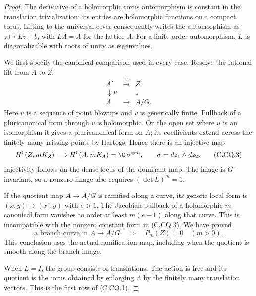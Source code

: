 \begin{proof}
The derivative of a holomorphic torus automorphism is
constant in the translation trivialization: its entries
are holomorphic functions on a compact torus. Lifting to
the universal cover consequently writes the automorphism
as $z\mapsto Lz+b$, with $L\Lambda=\Lambda$ for the
lattice $\Lambda$. For a finite-order automorphism, $L$
is diagonalizable with roots of unity as eigenvalues.

We first specify the canonical comparison used in every
case. Resolve the rational lift from $A$ to $Z$:
\[
\begin{array}{ccc}
A'&\xrightarrow{\ v\ }&Z\\
\downarrow{\scriptstyle u}&&\downarrow\\
A&\longrightarrow&A/G .
\end{array}                                                    \tag{C.CQ.2}
\]
Here $u$ is a sequence of point blowups and $v$ is
generically finite. Pullback of a pluricanonical form
through $v$ is holomorphic. On the open set where $u$
is an isomorphism it gives a pluricanonical form on
$A$; its coefficients extend across the finitely many
missing points by Hartogs. Hence there is an injective
map
\[
 H^0(Z,mK_Z)\longrightarrow H^0(A,mK_A)
                  =\C\,\sigma^{\otimes m},
 \qquad \sigma=dz_1\wedge dz_2 .
                                                               \tag{C.CQ.3}
\]
Injectivity follows on the dense locus of the dominant
map. The image is $G$-invariant, so a nonzero image
also requires $(\det L)^m=1$.

If the quotient map $A\to A/G$ is ramified along a
curve, its generic local form is
$(x,y)\mapsto(x^e,y)$ with $e>1$. The Jacobian
pullback of a holomorphic $m$-canonical form vanishes
to order at least $m(e-1)$ along that curve. This is
incompatible with the nonzero constant form in
(C.CQ.3). We have proved
\[
 \text{a branch curve in }A\longrightarrow A/G
       \quad\Longrightarrow\quad P_m(Z)=0\quad(m>0).
                                                               \tag{C.CQ.4}
\]
This conclusion uses the actual ramification map,
including when the quotient is smooth along the
branch image.

When $L=I$, the group consists of translations. The
action is free and its quotient is the torus obtained
by enlarging $\Lambda$ by the finitely many translation
vectors. This is the first row of (C.CQ.1).


\end{proof}
